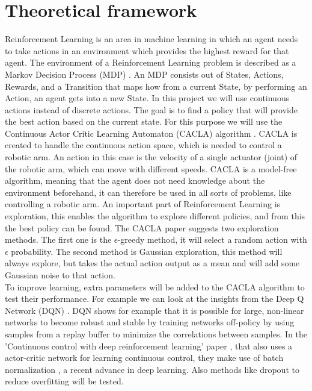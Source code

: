 \section{Theoretical framework}
Reinforcement Learning is an area in machine learning in which an agent needs to take actions in an environment which provides the highest reward for that agent. The environment of a Reinforcement Learning problem
is described as a Markov Decision Process (MDP) \cite{markov}. An MDP consists out of States, Actions, Rewards, and a Transition that maps how from a current State, by performing an Action, an agent gets into a new State. In this project
we will use continuous actions instead of discrete actions. The goal is to find a policy that will provide the best action based on the current state. 
For this purpose we will use the Continuous Actor Critic Learning Automaton (CACLA) algorithm \cite{van2007reinforcement}. CACLA is created to handle the continuous action space, which is needed to control a robotic arm. An action in this case is the velocity of a single actuator (joint) of the 
robotic arm, which can move with different speeds. CACLA is a model-free algorithm, meaning that the agent does not need knowledge about the environment beforehand, it can therefore be used in all sorts of problems, like controlling a 
robotic arm. An important part of Reinforcement Learning is exploration, this enables the algorithm to explore different policies, and from this the best policy can be found. 
The CACLA paper suggests two exploration methods. The first one is the $\epsilon$-greedy method, it will select a random action with $\epsilon$ probability. The second method is Gaussian exploration,
this method will always explore, but takes the actual action output as a mean and will add some Gaussian noise to that action. \\
To improve learning, extra parameters will be added to the CACLA algorithm to test their performance. For example we can look at the insights from the Deep Q Network (DQN) \cite{mnih2015human}. DQN shows for example that it is possible for 
large, non-linear networks to become robust and stable by training networks off-policy by using samples from a replay buffer to minimize the correlations between samples. In the 'Continuous control with deep reinforcement learning' paper
\cite{lillicrap2015continuous}, that also uses a actor-critic network for learning continuous control, they make use of 
batch normalization \cite{ioffe2015batch}, a recent advance in deep learning. Also methods like dropout \cite{srivastava2014dropout} to reduce overfitting will be tested. \\

